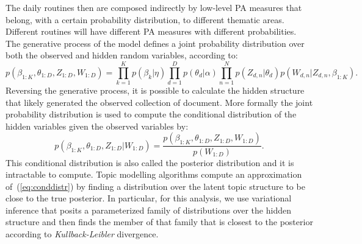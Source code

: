 The daily routines then are composed indirectly by low-level PA measures that belong, with a certain probability distribution, to different thematic areas. Different routines will have different PA measures with different probabilities. The generative process of the model defines a joint probability distribution over both the observed and hidden random variables, according to:
\begin{dmath*}
  p(\beta_{1:K},\theta_{1:D},Z_{1:D},W_{1:D}) = \prod_{k=1}^{K} p(\beta_{k}|\eta) \prod_{d=1}^{D} p(\theta_{d}|\alpha) \prod_{n=1}^{N} p(Z_{d,n}|\theta_{d}) p(W_{d,n}|Z_{d,n},\beta_{1:K}).
\nonumber\end{dmath*}
Reversing the generative process, it is possible to calculate the hidden structure that likely generated the observed collection of document. More formally the joint probability distribution is used to compute the conditional distribution of the hidden variables given the observed variables by: 
\begin{dmath}
  p(\beta_{1:K},\theta_{1:D},Z_{1:D}|W_{1:D}) =   \frac{p(\beta_{1:K},\theta_{1:D},Z_{1:D},W_{1:D})}{p(W_{1:D})}.
  \label{eq:conddistr}
\end{dmath}
This conditional distribution is also called the posterior distribution and it is intractable to compute. Topic modelling algorithms compute an approximation of~(\ref{eq:conddistr}) by finding a distribution over the latent topic structure to be close to the true posterior. In particular, for this analysis, we use variational inference that posits a parameterized family of distributions over the hidden structure and then finds the member of that family that is closest to the posterior according to \emph{Kullback-Leibler} divergence.





